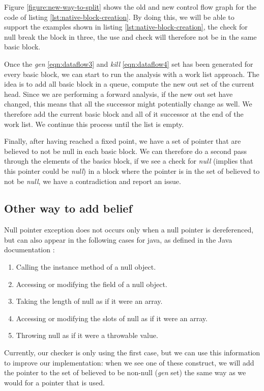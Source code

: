 Figure \ref{figure:new-way-to-split} shows the old and new control flow graph for the code of listing \ref{lst:native-block-creation}. 
By doing this, we will be able to support the examples shown in listing \ref{lst:native-block-creation}, the check for null break the block in three, the use and check will therefore not be in the same basic block.

Once the \emph{gen} \ref{eqn:dataflow3} and \emph{kill} \ref{eqn:dataflow4} set has been generated for every basic block, we can start to run the analysis with a work list approach.
The idea is to add all basic block in a queue, compute the new out set of the current head. 
Since we are performing a forward analysis, if the new out set have changed, this means that all the successor might potentially change as well. 
We therefore add the current basic block and all of it successor at the end of the work list. 
We continue this process until the list is empty.

Finally, after having reached a fixed point, we have a set of pointer that are believed to not be null in each basic block.
We can therefore do a second pass through the elements of the basics block, if we see a check for \emph{null} (implies that this pointer could be \emph{null}) in a block where the pointer is in the set of believed to not be \emph{null}, we have a contradiction and report an issue.

\subsection{Other way to add belief}
\label{subsec:other_way_to_add_belief}

Null pointer exception does not occurs only when a null pointer is dereferenced, but can also appear in the following cases for java, as defined in the Java documentation \cite{OracleDoc:2019:Online}:

\begin{enumerate}
	\item Calling the instance method of a null object. \newline 
	\item Accessing or modifying the field of a null object. \newline 
	\item Taking the length of null as if it were an array. \newline 
	\item Accessing or modifying the slots of null as if it were an array. \newline 
	\item Throwing null as if it were a throwable value. \newline 
\end{enumerate}

Currently, our checker is only using the first case, but we can use this information to improve our implementation: when we see one of these construct, we will add the pointer to the set of believed to be non-null (\emph{gen} set) the same way as we would for a pointer that is used.


